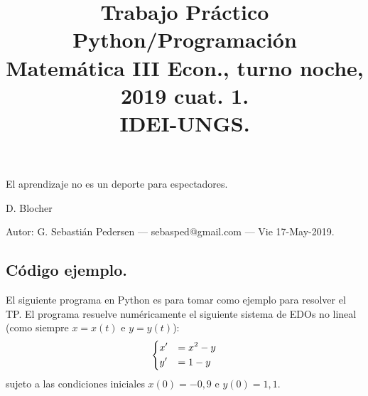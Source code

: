 \documentclass[a4paper,11pt,landscape,twocolumn]{article}
\title{Trabajo Práctico Python/Programación\\ Matemática III Econ., turno noche, 2019 cuat. 1.\\ IDEI-UNGS.}
\date{}
\begin{document}
\maketitle
\epigraph{El aprendizaje no es un deporte para espectadores.}{D. Blocher}	
\noindent Autor: G. Sebastián Pedersen --- sebasped@gmail.com --- Vie 17-May-2019.
\subsection*{Código ejemplo.} El siguiente programa en Python es para tomar como ejemplo para resolver el TP. El programa resuelve numéricamente el siguiente sistema de EDOs no lineal (como siempre $x=x(t)$ e $y=y(t)$):
$$
\begin{dcases}
x'       & = x^2-y\\
y'    & = 1-y\\
\end{dcases}
$$ 
sujeto a las condiciones iniciales $x(0)=-0,\!9$ e $y(0)=1,\!1$.
\end{document}
